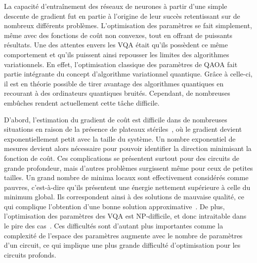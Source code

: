 La capacité d'entraînement des réseaux de neurones à partir d'une simple descente de gradient fut en partie à l'origine de leur succès retentissant sur de nombreux différents problèmes. L'optimisation des paramètres se fait simplement, même avec des fonctions de coût non convexes, tout en offrant de puissants résultats. Une des attentes envers les VQA était qu'ils possèdent ce même comportement et qu'ils puissent ainsi repousser les limites des algorithmes variationnels. En effet, l'optimisation classique des paramètres de QAOA fait partie intégrante du concept d'algorithme variationnel quantique. Grâce à celle-ci, il est en théorie possible de tirer avantage des algorithmes quantiques en recourant à des ordinateurs quantiques bruités. Cependant, de nombreuses embûches rendent actuellement cette tâche difficile. 

D'abord, l'estimation du gradient de coût est difficile dans de nombreuses situations en raison de la présence de plateaux stériles~\cite{mccleanBarrenPlateausQuantum2018, laroccaReviewBarrenPlateaus2024}, où le gradient devient exponentiellement petit avec la taille du système. Un nombre exponentiel de mesures devient alors nécessaire pour pouvoir identifier la direction minimisant la fonction de coût. Ces complications se présentent surtout pour des circuits de grande profondeur, mais d'autres problèmes surgissent même pour ceux de petites tailles. Un grand nombre de minima locaux sont effectivement considérés comme pauvres, c'est-à-dire qu'ils présentent une énergie nettement supérieure à celle du minimum global. Ils correspondent ainsi à des solutions de mauvaise qualité, ce qui complique l'obtention d'une bonne solution approximative~\cite{anschuetzQuantumVariationalAlgorithms2022}. De plus, l'optimisation des paramètres des VQA est \textsf{NP}-difficile, et donc intraitable dans le pire des cas~\cite{bittelTrainingVariationalQuantum2021}. Ces difficultés sont d'autant plus importantes comme la complexité de l'espace des paramètres augmente avec le nombre de paramètres d'un circuit, ce qui implique une plus grande difficulté d'optimisation pour les circuits profonds. 

